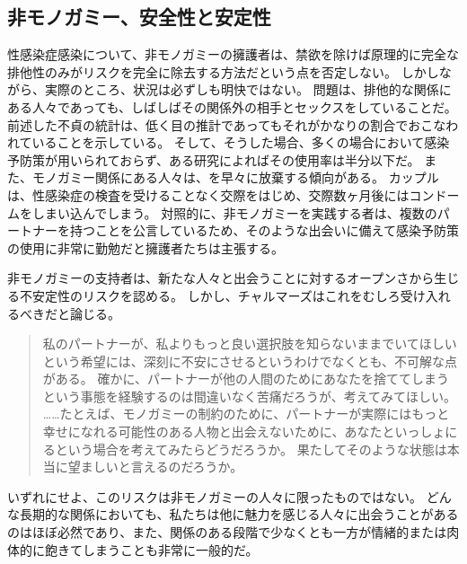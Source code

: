 \documentclass[paper=a4,book,openany]{jlreq}
\begin{document}
\subsection{非モノガミー、安全性と安定性}

性感染症感染について、非モノガミーの擁護者は、禁欲を除けば原理的に完全な排他性のみがリスクを完全に除去する方法だという点を否定しない。
しかしながら、実際のところ、状況は必ずしも明快ではない。
問題は、排他的な関係にある人々であっても、しばしばその関係外の相手とセックスをしていることだ。
前述した不貞の統計は、低く目の推計であってもそれがかなりの割合でおこなわれていることを示している。
そして、そうした場合、多くの場合において感染予防策が用いられておらず、ある研究によればその使用率は半分以下だ\citep{conley12:_unfait_indiv_are_less_likel}。
また、モノガミー関係にある人々は、を早々に放棄する傾向がある。
カップルは、性感染症の検査を受けることなく交際をはじめ、交際数ヶ月後にはコンドームをしまい込んでしまう\citep{glauser11:_how_talk_patien_sti_screen}。
対照的に、非モノガミーを実践する者は、複数のパートナーを持つことを公言しているため、そのような出会いに備えて感染予防策の使用に非常に勤勉だと擁護者たちは主張する\citep{soh16:_insig_kinky_nonmon_sex}。

非モノガミーの支持者は、新たな人々と出会うことに対するオープンさから生じる不安定性のリスクを認める。
しかし、チャルマーズはこれをむしろ受け入れるべきだと論じる。

\begin{quote}
私のパートナーが、私よりもっと良い選択肢を知らないままでいてほしいという希望には、深刻に不安にさせるというわけでなくとも、不可解な点がある。
確かに、パートナーが他の人間のためにあなたを捨ててしまうという事態を経験するのは間違いなく苦痛だろうが、考えてみてほしい。
……たとえば、モノガミーの制約のために、パートナーが実際にはもっと幸せになれる可能性のある人物と出会えないために、あなたといっしょにるという場合を考えてみたらどうだろうか。
果たしてそのような状態は本当に望ましいと言えるのだろうか。
\citep{chalmers19:_is_monog_moral_permis}
\end{quote}

いずれにせよ、このリスクは非モノガミーの人々に限ったものではない。
どんな長期的な関係においても、私たちは他に魅力を感じる人々に出会うことがあるのはほぼ必然であり、また、関係のある段階で少なくとも一方が情緒的または肉体的に飽きてしまうことも非常に一般的だ。
\end{document}
